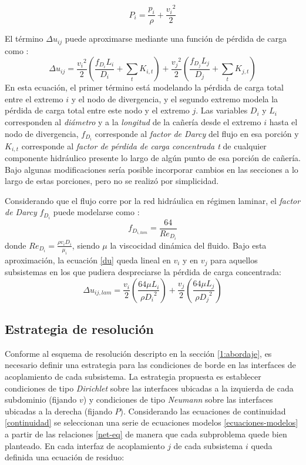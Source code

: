 \begin{equation}
P_i = \frac{p_i}{\rho} + \frac{{v_i}^2}{2}
\label{p-eyd}
\end{equation}

El término $\Delta u_{ij}$ puede aproximarse mediante una función de pérdida de carga como \cite{white}:
\begin{equation}
\Delta u_{ij} = \frac{{v_i}^2}{2} \left ( \frac{f_{D_i} L_{i}}{D_i} + \sum_t K_{i,t} \right ) + \frac{{v_j}^2}{2} \left ( \frac{f_{D_j} L_{j}}{D_j} + \sum_t K_{j,t} \right )
\label{du}
\end{equation}
En esta ecuación, el primer término está modelando la pérdida de carga total entre el extremo $i$ y el nodo de divergencia,
y el segundo extremo modela la pérdida de carga total entre este nodo y el extremo $j$.
Las variables $D_i$ y $L_i$ corresponden al \textit{diámetro} y a la \textit{longitud} de la cañería desde el extremo $i$ hasta el nodo de divergencia,
$f_{D_i}$ corresponde al \textit{factor de Darcy} del flujo en esa porción
y $K_{i,t}$ corresponde al \textit{factor de pérdida de carga concentrada t} de cualquier componente hidráulico presente lo largo de algún punto de esa porción de cañería.
Bajo algunas modificaciones sería posible incorporar cambios en las secciones a lo largo de estas porciones, pero no se realizó por simplicidad.

Considerando que el flujo corre por la red hidráulica en régimen laminar, el \textit{factor de Darcy} $f_{D_i}$ puede modelarse como \cite{white}:
\begin{equation}
f_{D_{{i},lam}} = \frac{64}{Re_{D_i}}
\label{f-lam}
\end{equation}
donde $Re_{D_i}=\frac{\rho v_i D_i} {\mu_i}$, siendo $\mu$ la viscocidad dinámica del fluido.
Bajo esta aproximación, la ecuación \ref{du} queda lineal en $v_i$ y en $v_j$ para aquellos subsistemas en los que pudiera despreciarse la pérdida de carga concentrada:
\begin{equation}
\Delta u_{ij,lam} = \frac{{v_i}}{2} \left ( \frac{64 \mu L_{i}}{\rho {D_i}^{2}} \right ) + \frac{{v_j}}{2} \left ( \frac{64 \mu L_{j}}{\rho {D_j}^{2}} \right )
\label{du}
\end{equation}


\subsection*{Estrategia de resolución}
\label{resolucion-net}

Conforme al esquema de resolución descripto en la sección \ref{1:abordaje},
es necesario definir una estrategia para las condiciones de borde en las interfaces de acoplamiento de cada subsistema.
La estrategia propuesta es establecer condiciones de tipo \textit{Dirichlet} sobre las interfaces ubicadas a la izquierda de cada subdominio (fijando $v$)
y condiciones de tipo \textit{Neumann} sobre las interfaces ubicadas a la derecha (fijando $P$).
Considerando las ecuaciones de continuidad \ref{continuidad} se seleccionan una serie de ecuaciones modelos \ref{ecuaciones-modelos}
a partir de las relaciones \ref{net-eq} de manera que cada subproblema quede bien planteado.
En cada interfaz de acoplamiento $j$ de cada subsistema $i$ queda definida una ecuación de residuo:

